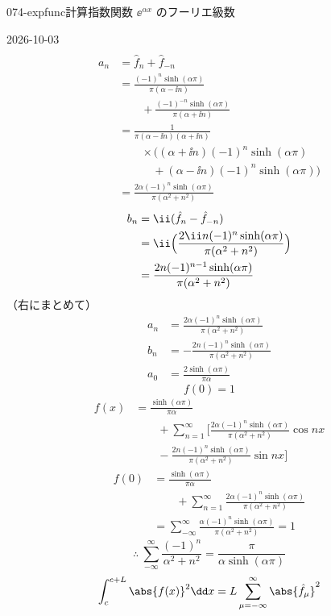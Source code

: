 \documentclass[uplatex,dvipdfmx,a4paper,11pt]{jsarticle}
\begin{document}
\begin{mondai}{074-expfunc}{計算}{指数関数 $\ee^{\alpha x}$ のフーリエ級数}
\begin{kotaeutsushi}{2026-10-03}
\begin{align*}
\end{align*}
\begin{align*}
  a_n&=\hat{f}_n+\hat{f}_{-n}\\
  &=\frac{(-1)^{n}\sinh(\alpha\pi)}{\pi(\alpha-\ii n)}\\
  &\qquad+\frac{(-1)^{-n}\sinh(\alpha\pi)}{\pi(\alpha+\ii n)}\\
  &=\frac{1}{\pi(\alpha-\ii n)(\alpha+\ii n)}\\
  &\qquad\times\bigl((\alpha+\ii n)(-1)^{n}\sinh(\alpha\pi)\\
  &\qquad\quad+(\alpha-\ii n)(-1)^{n}\sinh(\alpha\pi)\bigr)\\
  &=\frac{2\alpha(-1)^{n}\sinh(\alpha\pi)}{\pi(\alpha^{2}+n^{2})}
\end{align*}
\begin{align*}
  b_n&=\ii(\hat{f}_n-\hat{f}_{-n})\\
  &=\ii\Bigl(\frac{2\ii n(-1)^{n}\sinh(\alpha\pi)}{\pi(\alpha^{2}+n^{2})}\Bigr)\\
  &=\frac{2n(-1)^{n-1}\sinh(\alpha\pi)}{\pi(\alpha^{2}+n^{2})}
\end{align*}
（右にまとめて）
\begin{align*}
  a_n&=\frac{2\alpha(-1)^{n}\sinh(\alpha\pi)}{\pi(\alpha^{2}+n^{2})}\\
  b_n&=-\frac{2n(-1)^{n}\sinh(\alpha\pi)}{\pi(\alpha^{2}+n^{2})}\\
  a_0&=\frac{2\sinh(\alpha\pi)}{\pi\alpha}
\end{align*}
\[ f(0)=1 \]
\begin{align*}
  f(x)&=\frac{\sinh(\alpha\pi)}{\pi\alpha}\\
  &\qquad+\sum_{n=1}^{\infty}\biggl[\frac{2\alpha(-1)^{n}\sinh(\alpha\pi)}{\pi(\alpha^{2}+n^{2})}\cos nx\\
  &\qquad-\frac{2n(-1)^{n}\sinh(\alpha\pi)}{\pi(\alpha^{2}+n^{2})}\sin nx\biggr]
\end{align*}
\begin{align*}
  f(0)&=\frac{\sinh(\alpha\pi)}{\pi\alpha}\\
  &\qquad+\sum_{n=1}^{\infty}\frac{2\alpha(-1)^{n}\sinh(\alpha\pi)}{\pi(\alpha^{2}+n^{2})}\\
  &=\sum_{-\infty}^{\infty}\frac{\alpha(-1)^{n}\sinh(\alpha\pi)}{\pi(\alpha^{2}+n^{2})}=1
\end{align*}
\[ \therefore\ \sum_{-\infty}^{\infty}\frac{(-1)^{n}}{\alpha^{2}+n^{2}}=\frac{\pi}{\alpha\sinh(\alpha\pi)} \]
\[ \int_{c}^{c+L}\abs{f(x)}^{2}\dd x=L\sum_{\mu=-\infty}^{\infty}\abs{\hat{f}_{\mu}}^{2} \]

\end{kotaeutsushi}
\end{mondai}
\end{document}
